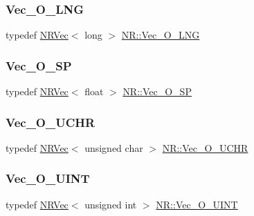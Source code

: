 \mbox{\label{namespaceNR_a1260716c95164012314152d97535c2fa}} 
\subsubsection{\texorpdfstring{Vec\_O\_LNG}{Vec\_O\_LNG}}
{\footnotesize\ttfamily typedef \mbox{\hyperlink{classNR_1_1NRVec}{N\+R\+Vec}}$<$ long $>$ \mbox{\hyperlink{namespaceNR_a1260716c95164012314152d97535c2fa}{N\+R\+::\+Vec\+\_\+\+O\+\_\+\+L\+NG}}}

\mbox{\label{namespaceNR_ab5c69ea1aee9a86bcaed5efdcc803162}} 
\subsubsection{\texorpdfstring{Vec\_O\_SP}{Vec\_O\_SP}}
{\footnotesize\ttfamily typedef \mbox{\hyperlink{classNR_1_1NRVec}{N\+R\+Vec}}$<$ float $>$ \mbox{\hyperlink{namespaceNR_ab5c69ea1aee9a86bcaed5efdcc803162}{N\+R\+::\+Vec\+\_\+\+O\+\_\+\+SP}}}

\mbox{\label{namespaceNR_ac322e5f1208609bf101390ed2495b7d5}} 
\subsubsection{\texorpdfstring{Vec\_O\_UCHR}{Vec\_O\_UCHR}}
{\footnotesize\ttfamily typedef \mbox{\hyperlink{classNR_1_1NRVec}{N\+R\+Vec}}$<$ unsigned char $>$ \mbox{\hyperlink{namespaceNR_ac322e5f1208609bf101390ed2495b7d5}{N\+R\+::\+Vec\+\_\+\+O\+\_\+\+U\+C\+HR}}}

\mbox{\label{namespaceNR_aa2c2f818c1de114f74a2c3ea1f639da4}} 
\subsubsection{\texorpdfstring{Vec\_O\_UINT}{Vec\_O\_UINT}}
{\footnotesize\ttfamily typedef \mbox{\hyperlink{classNR_1_1NRVec}{N\+R\+Vec}}$<$ unsigned int $>$ \mbox{\hyperlink{namespaceNR_aa2c2f818c1de114f74a2c3ea1f639da4}{N\+R\+::\+Vec\+\_\+\+O\+\_\+\+U\+I\+NT}}}

